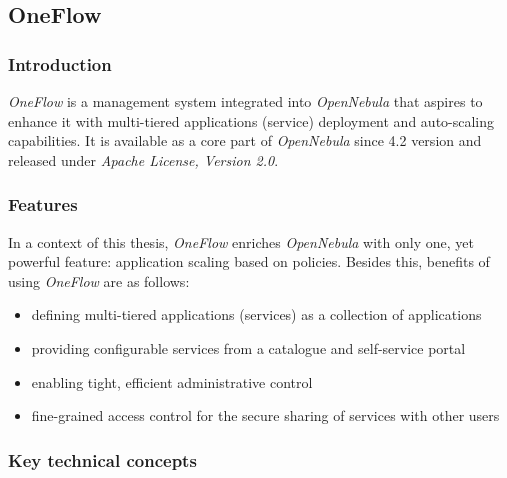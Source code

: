 \subsection{OneFlow}

\subsubsection{Introduction}
\emph{OneFlow} \cite{OneFlow} is a management system integrated into \emph{OpenNebula} that aspires to enhance it with multi-tiered applications (service) deployment and auto-scaling capabilities. It is available as a core part of \emph{OpenNebula} since 4.2 version and released under \emph{Apache License, Version 2.0}. 

\subsubsection{Features}
In a context of this thesis, \emph{OneFlow} enriches \emph{OpenNebula} with only one, yet powerful feature: application scaling based on policies. Besides this, benefits of using \emph{OneFlow} are as follows:
\begin{itemize}
\item defining multi-tiered applications (services) as a collection of applications
\item providing configurable services from a catalogue and self-service portal
\item enabling tight, efficient administrative control
\item fine-grained access control for the secure sharing of services with other users
\end{itemize}

\subsubsection{Key technical concepts}

